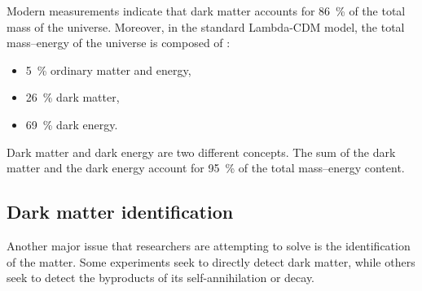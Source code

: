 Modern measurements indicate that dark matter accounts for \SI{86}{\percent} of the total mass of the universe. Moreover, in the standard Lambda-CDM model, the total mass–energy of the universe is composed of \cite{feng_2010_dark}:

\begin{itemize}
    \itemsep0em
    \item \SI{5}{\percent} ordinary matter and energy,
    \item \SI{26}{\percent} dark matter,
    \item \SI{69}{\percent} dark energy.
\end{itemize}

Dark matter and dark energy are two different concepts. The sum of the dark matter and the dark energy account for \SI{95}{\percent} of the total mass–energy content.


\subsection*{Dark matter identification}

Another major issue that researchers are attempting to solve is the identification of the matter. Some experiments seek to directly detect dark matter, while others seek to detect the byproducts of its self-annihilation or decay.

